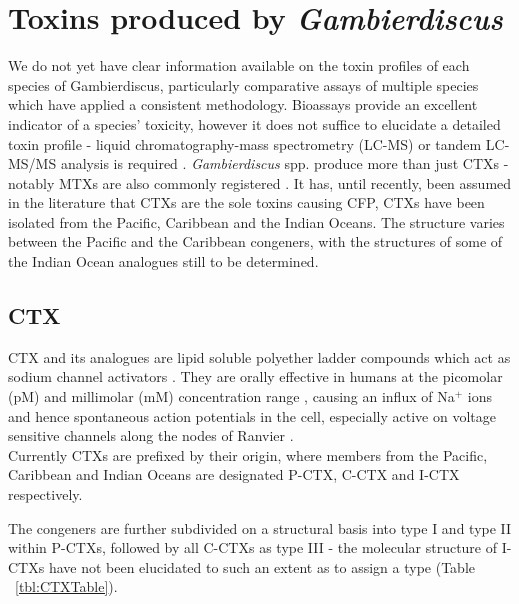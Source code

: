 \documentclass[12pt]{article}
\begin{document}
\section{Toxins produced by \emph{Gambierdiscus}}

We do not yet have clear information available on the toxin profiles of each species of Gambierdiscus, particularly comparative assays of multiple species which have applied a consistent methodology. Bioassays provide an excellent indicator of a species' toxicity, however it does not suffice to elucidate a detailed toxin profile - liquid chromatography-mass spectrometry (LC-MS) or tandem LC-MS/MS analysis is required \cite{diogened2014chemistry}. \emph{Gambierdiscus} spp. produce more than just CTXs - notably MTXs are also commonly registered \cite{holmes1994purification,murata1993structure}. It has, until recently, been assumed in the literature that CTXs are the sole toxins causing CFP, CTXs have been isolated from the Pacific, Caribbean and the Indian Oceans. The  structure varies between the Pacific and the Caribbean congeners, with the structures of some of the Indian Ocean analogues still to be determined. \\

\subsection{CTX}
CTX and its analogues are lipid soluble polyether ladder compounds which act as sodium channel activators \cite{dechraoui1999ciguatoxins}. They are orally effective in humans at the picomolar (pM) and millimolar (mM) concentration range \cite{molgo2000ciguatera}, causing an influx of Na$^{+}$ ions and hence spontaneous action potentials in the cell, especially active on voltage sensitive channels along the nodes of Ranvier \cite{sims1987theoretical,mattei1999neurotoxins,lewis1992action,molgo2000ciguatera}. \\
Currently CTXs are prefixed by their origin, where members from the Pacific, Caribbean and Indian Oceans are designated P-CTX, C-CTX and I-CTX respectively. %

The congeners are further subdivided on a structural basis into type I and type II within P-CTXs, followed by all C-CTXs as type III - the molecular structure of I-CTXs have not been elucidated to such an extent as to assign a type \cite{legrand1997two,hamilton2002multiple,hamilton2002isolation} (Table ~\ref{tbl:CTXTable}).  \\
\end{document}
